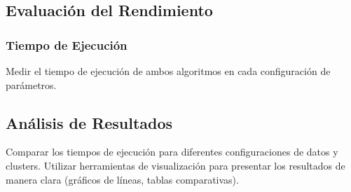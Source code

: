 \documentclass[conference]{IEEEtran}
\begin{document}
\subsection{Evaluación del Rendimiento}
\subsubsection{Tiempo de Ejecución}
Medir el tiempo de ejecución de ambos algoritmos en cada configuración de parámetros.
\subsection{Análisis de Resultados}
Comparar los tiempos de ejecución para diferentes configuraciones de datos y clusters.
Utilizar herramientas de visualización para presentar los resultados de manera clara (gráficos de líneas, tablas comparativas).
\end{document}
